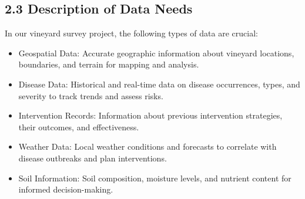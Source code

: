 \subsection{2.3 Description of Data Needs}
In our vineyard survey project, the following types of data are crucial:
\begin{itemize}
    \item Geospatial Data: Accurate geographic information about vineyard locations, boundaries, and terrain for mapping and analysis.
    \item Disease Data: Historical and real-time data on disease occurrences, types, and severity to track trends and assess risks.
    \item Intervention Records: Information about previous intervention strategies, their outcomes, and effectiveness.
    \item Weather Data: Local weather conditions and forecasts to correlate with disease outbreaks and plan interventions.
    \item Soil Information: Soil composition, moisture levels, and nutrient content for informed decision-making.
\end{itemize}